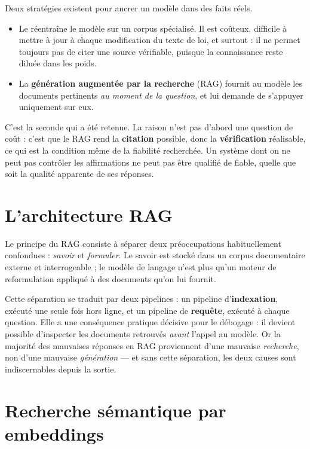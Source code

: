 Deux stratégies existent pour ancrer un modèle dans des faits réels.

\begin{itemize}
  \item Le \textbf{} réentraîne le modèle sur un corpus spécialisé. Il est
        coûteux, difficile à mettre à jour à chaque modification du texte de loi, et surtout : il
        ne permet toujours pas de citer une source vérifiable, puisque la connaissance reste
        diluée dans les poids.
  \item La \textbf{génération augmentée par la recherche} (RAG) fournit au modèle les documents
        pertinents \emph{au moment de la question}, et lui demande de s'appuyer uniquement sur
        eux.
\end{itemize}

C'est la seconde qui a été retenue. La raison n'est pas d'abord une question de coût : c'est que
le RAG rend la \textbf{citation} possible, donc la \textbf{vérification} réalisable, ce qui est la
condition même de la fiabilité recherchée. Un système dont on ne peut pas contrôler les
affirmations ne peut pas être qualifié de fiable, quelle que soit la qualité apparente de ses
réponses.

\section{L'architecture RAG}

Le principe du RAG consiste à séparer deux préoccupations habituellement confondues :
\emph{savoir} et \emph{formuler}. Le savoir est stocké dans un corpus documentaire externe et
interrogeable ; le modèle de langage n'est plus qu'un moteur de reformulation appliqué à des
documents qu'on lui fournit.

Cette séparation se traduit par deux pipelines : un pipeline d'\textbf{indexation}, exécuté une
seule fois hors ligne, et un pipeline de \textbf{requête}, exécuté à chaque question. Elle a une
conséquence pratique décisive pour le débogage : il devient possible d'inspecter les documents
retrouvés \emph{avant} l'appel au modèle. Or la majorité des mauvaises réponses en RAG proviennent
d'une mauvaise \emph{recherche}, non d'une mauvaise \emph{génération} --- et sans cette
séparation, les deux causes sont indiscernables depuis la sortie.

\section{Recherche sémantique par embeddings}

